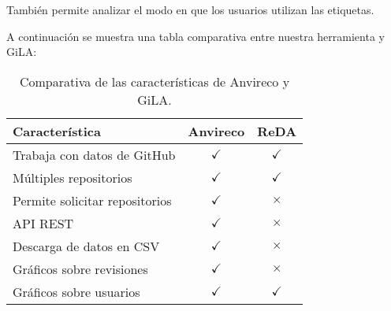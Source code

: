 También permite analizar el modo en que los usuarios utilizan las etiquetas.

A continuación se muestra una tabla comparativa entre nuestra herramienta y GiLA:

\begin{table}[H]
\centering
\begin{tabular}{lcc}
\toprule
Característica & Anvireco & ReDA \\
\midrule
Trabaja con datos de GitHub & \cellcolor{green!25} {$\checkmark$} & \cellcolor{green!25} {$\checkmark$} \\
Múltiples repositorios & \cellcolor{green!25} {$\checkmark$} & \cellcolor{green!25} {$\checkmark$} \\
Permite solicitar repositorios & \cellcolor{green!25} {$\checkmark$} & \cellcolor{red!25} {$\times$} \\
API REST & \cellcolor{green!25} {$\checkmark$} & \cellcolor{red!25} {$\times$} \\
Descarga de datos en CSV & \cellcolor{green!25} {$\checkmark$} & \cellcolor{red!25} {$\times$} \\
Gráficos sobre revisiones & \cellcolor{green!25} {$\checkmark$} & \cellcolor{red!25} {$\times$} \\
Gráficos sobre usuarios & \cellcolor{green!25} {$\checkmark$} & \cellcolor{green!25} {$\checkmark$} \\
\bottomrule
\end{tabular}
\caption{Comparativa de las características de Anvireco y GiLA.}
\label{comparativa-anvireco-gila}
\end{table}
